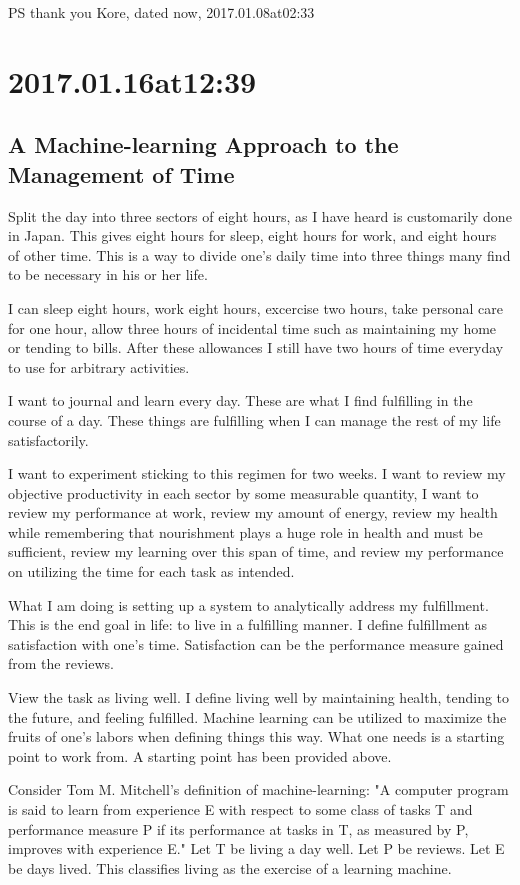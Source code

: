 PS thank you Kore, dated now, 2017.01.08at02:33

\section*{ 2017.01.16at12:39 }
\subsection*{ A Machine-learning Approach to the Management of Time }
Split the day into three sectors of eight hours, as I have heard is customarily done in Japan.
This gives eight hours for sleep, eight hours for work, and eight hours of other time.
This is a way to divide one's daily time into three things many find to be necessary in his or her life.

I can sleep eight hours, work eight hours, excercise two hours, take personal care for one hour, allow three hours of incidental time such as maintaining my home or tending to bills.
After these allowances I still have two hours of time everyday to use for arbitrary activities.

I want to journal and learn every day.
These are what I find fulfilling in the course of a day.
These things are fulfilling when I can manage the rest of my life satisfactorily.

I want to experiment sticking to this regimen for two weeks.
I want to review my objective productivity in each sector by some measurable quantity, I want to review my performance at work, review my amount of energy, review my health while remembering that nourishment plays a huge role in health and must be sufficient, review my learning over this span of time, and review my performance on utilizing the time for each task as intended.

What I am doing is setting up a system to analytically address my fulfillment.
This is the end goal in life: to live in a fulfilling manner.
I define fulfillment as satisfaction with one's time.
Satisfaction can be the performance measure gained from the reviews.

View the task as living well.
I define living well by maintaining health, tending to the future, and feeling fulfilled.
Machine learning can be utilized to maximize the fruits of one's labors when defining things this way.
What one needs is a starting point to work from.
A starting point has been provided above. 

Consider Tom M. Mitchell's definition of machine-learning: "A computer program is said to learn from experience E with respect to some class of tasks T and performance measure P if its performance at tasks in T, as measured by P, improves with experience E."
Let T be living a day well.
Let P be reviews.
Let E be days lived.
This classifies living as the exercise of a learning machine.

